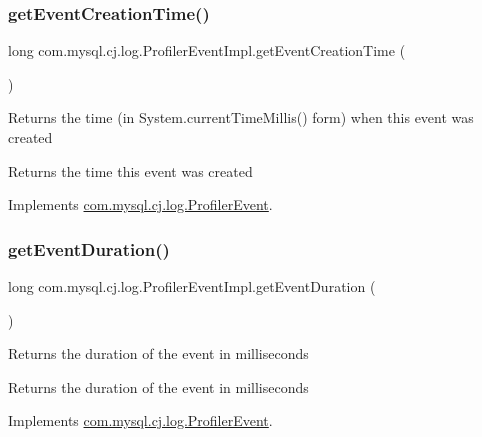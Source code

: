 \subsubsection{\texorpdfstring{get\+Event\+Creation\+Time()}{getEventCreationTime()}}
{\footnotesize\ttfamily long com.\+mysql.\+cj.\+log.\+Profiler\+Event\+Impl.\+get\+Event\+Creation\+Time (\begin{DoxyParamCaption}{ }\end{DoxyParamCaption})}

Returns the time (in System.\+current\+Time\+Millis() form) when this event was created

\begin{DoxyReturn}{Returns}
the time this event was created 
\end{DoxyReturn}


Implements \mbox{\hyperlink{interfacecom_1_1mysql_1_1cj_1_1log_1_1_profiler_event_aaadc6536f2576ccdc026fe5ad1d01ff0}{com.\+mysql.\+cj.\+log.\+Profiler\+Event}}.

\mbox{\label{classcom_1_1mysql_1_1cj_1_1log_1_1_profiler_event_impl_a52efd224f93dd9a3238995df02e4f330}} 
\subsubsection{\texorpdfstring{get\+Event\+Duration()}{getEventDuration()}}
{\footnotesize\ttfamily long com.\+mysql.\+cj.\+log.\+Profiler\+Event\+Impl.\+get\+Event\+Duration (\begin{DoxyParamCaption}{ }\end{DoxyParamCaption})}

Returns the duration of the event in milliseconds

\begin{DoxyReturn}{Returns}
the duration of the event in milliseconds 
\end{DoxyReturn}


Implements \mbox{\hyperlink{interfacecom_1_1mysql_1_1cj_1_1log_1_1_profiler_event_a82728ebce7920e4a0096f8135ec8336b}{com.\+mysql.\+cj.\+log.\+Profiler\+Event}}.

\mbox{\label{classcom_1_1mysql_1_1cj_1_1log_1_1_profiler_event_impl_a617ef1b80526a6401966ce38ad320872}} 
